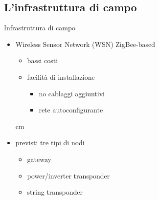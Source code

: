 \documentclass{beamer}
\newcommand{\N}{\vskip 0.3 cm}
\newcommand{\red}[1]{\textcolor[rgb]{.8,0,0}{#1}}
\begin{document}
%
\subsection{L'infrastruttura di campo}
\begin{frame}{Infrastruttura di campo}
%
\begin{itemize}
  \item \red{Wireless Sensor Network} (WSN) ZigBee-based
    \begin{itemize}
    \item bassi costi
    \item facilit\`a di installazione
      \begin{itemize}
      \item no cablaggi aggiuntivi
      \item rete autoconfigurante
      \end{itemize}
    \end{itemize}
    \N
  \item previsti tre tipi di nodi
    \begin{itemize}
    \item \red{gateway}
    \item \red{power/inverter transponder}
    \item \red{string transponder}
    \end{itemize}
\end{itemize}
%
\end{frame}
%
\end{document}
